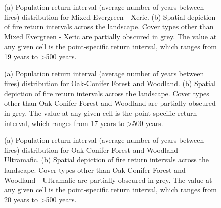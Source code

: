 \begin{figure}[!htbp]
  \centering
  \caption{(a) Population return interval (average number of years between fires) distribution for Mixed Evergreen - Xeric.  (b) Spatial depiction of fire return intervals across the landscape. Cover types other than Mixed Evergreen - Xeric are partially obscured in grey. The value at any given cell is the point-specific return interval, which ranges from 19 years to \textgreater 500 years.}
\label{fig:preturn_megx}
\end{figure}

\begin{figure}[!htbp]
  \centering
  \caption{(a) Population return interval (average number of years between fires) distribution for Oak-Conifer Forest and Woodland.  (b) Spatial depiction of fire return intervals across the landscape. Cover types other than Oak-Conifer Forest and Woodland are partially obscured in grey. The value at any given cell is the point-specific return interval, which ranges from 17 years to \textgreater 500 years.}
\label{fig:preturn_ocfw}
\end{figure}

\begin{figure}[!htbp]
  \centering
  \caption{(a) Population return interval (average number of years between fires) distribution for Oak-Conifer Forest and Woodland - Ultramafic.  (b) Spatial depiction of fire return intervals across the landscape. Cover types other than Oak-Conifer Forest and Woodland - Ultramafic are partially obscured in grey. The value at any given cell is the point-specific return interval, which ranges from 20 years to \textgreater 500 years.}
\label{fig:preturn_ocfwu}
\end{figure}

